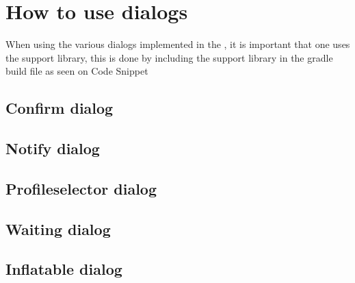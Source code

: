 \chapter{How to use dialogs}
\label{app:how_to_use_dialogs}

When using the various dialogs implemented in the \gc, it is important that one uses the support library, this is done by including the support library in the gradle build file as seen on Code Snippet 



\section{Confirm dialog}
\label{sec:impl_confirm_dialog}



\section{Notify dialog}
\label{sec:impl_notify_dialog}

\section{Profileselector dialog}
\label{sec:profileselector_dialog}

\section{Waiting dialog}
\label{sec:waiting_dialog}

\section{Inflatable dialog}
\label{sec:inflatable_dialog}
